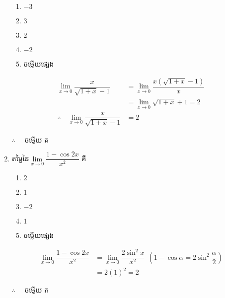 \documentclass[12pt, a4paper]{article}
\begin{document}
\begin{enumerate}[m]
	\begin{enumerate}[k,5]
		\item $-3$
		\item $3$
		\item $2$
		\item $-2$
		\item ចម្លើយផ្សេង
	\end{enumerate}
	\answer
	\begin{align*}
	\lim\limits_{x\to0}\dfrac{x}{\sqrt{1+x}-1} &= 	\lim\limits_{x\to0}\dfrac{x\left(\sqrt{1+x}-1\right)}{x} \\
	&=\lim\limits_{x\to0}\sqrt{1+x}+1 = 2\\
	\therefore \quad \lim\limits_{x\to0}\dfrac{x}{\sqrt{1+x}-1} &= 2
	\end{align*}
	\begin{center}
		$\therefore \quad$ \kml ចម្លើយ \kbk គ
	\end{center}
	\newpage
	\item តម្លៃនៃ$\lim\limits_{x\to0}\dfrac{1-\cos2x}{x^2}$ គឺ
	\begin{enumerate}[k,5]
		\item $2$
		\item $1$
		\item $-2$
		\item $1$
		\item ចម្លើយផ្សេង
	\end{enumerate}
	\answer
	\begin{align*}
	\lim\limits_{x\to0}\dfrac{1-\cos2x}{x^2} &=
	\lim\limits_{x\to0}\dfrac{2\sin^2x}{x^2}~~\left(1-\cos\alpha=2\sin^2\dfrac{\alpha}{2}\right)\\
	&=2\left(1\right)^2=2
	\end{align*}
	\begin{center}
		$\therefore \quad$ \kml ចម្លើយ \kbk ក
	\end{center}
	{\color{blue}\hrulefill}
	

\end{enumerate}
\end{document}
